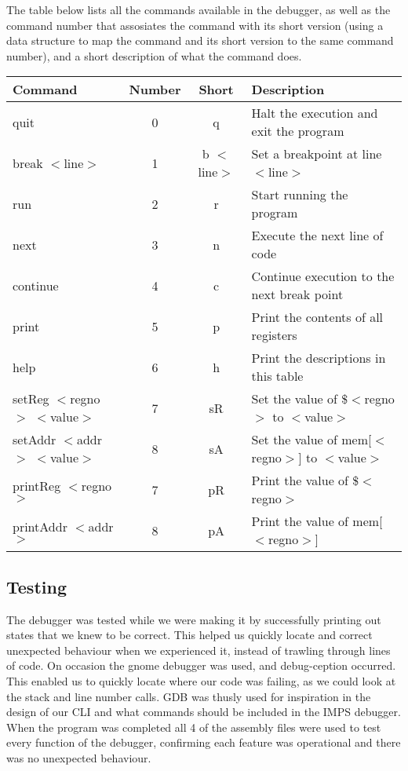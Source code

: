 \documentclass[11pt]{report}
\begin{document}
The table below lists all the commands available in the debugger, as well as the 
command number that assosiates the command with its short version (using a data 
structure to map the command and its short version to the same command number), 
and a short description of what the command does.
\\
\begin{adjustwidth}{-.5in}{-.5in} 
	\begin{center} 
	\begin{tabular}{ | l | c | c | p{5cm} |}
	\hline
	Command & Number & Short & Description \\ \hline
	quit & 0 & q & Halt the execution and exit the program \\ \hline
	break $<$line$>$ & 1 & b $<$line$>$ & Set a breakpoint at line $<$line$>$ \\ \hline
	run & 2 & r & Start running the program \\ \hline
	next & 3 & n & Execute the next line of code \\ \hline
	continue & 4 & c & Continue execution to the next break point \\ \hline
	print & 5 & p & Print the contents of all registers \\ \hline
	help & 6 & h & Print the descriptions in this table \\ \hline
	setReg $<$regno$>$ $<$value$>$ & 7 & sR & Set the value of \$$<$regno$>$ to $<$value$>$ \\ \hline
	setAddr $<$addr$>$ $<$value$>$ & 8 & sA & Set the value of mem[$<$regno$>$] to $<$value$>$ \\ \hline
	printReg $<$regno$>$ & 7 & pR & Print the value of \$$<$regno$>$ \\ \hline
	printAddr $<$addr$>$ & 8 & pA & Print the value of mem[$<$regno$>$] \\ \hline
	\end{tabular}
	\end{center}
\end{adjustwidth}

\subsection*{Testing}

The debugger was tested while we were making it by successfully printing out states that we knew to be correct. 
This helped us quickly locate and correct unexpected behaviour when we experienced it, instead of trawling through 
lines of code. On occasion the gnome debugger was used, and debug-ception occurred. This enabled us to quickly 
locate where our code was failing, as we could look at the stack and line number calls. GDB was thusly used
for inspiration in the design of our CLI and what commands should be included in the IMPS debugger. When 
the program was completed all 4 of the assembly files were used to test every function of the debugger, confirming
each feature was operational and there was no unexpected behaviour.
\end{document}
